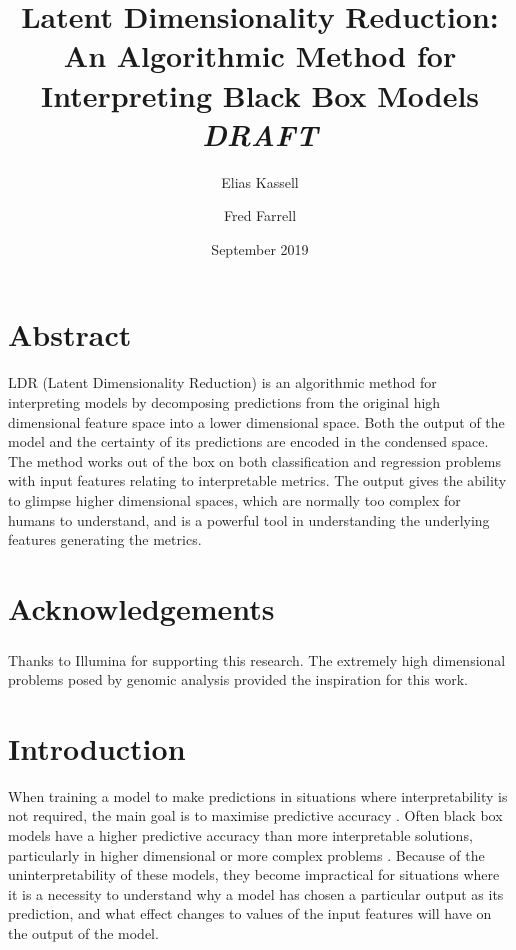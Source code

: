 \documentclass[a4paper, oneside, twocolumn]{article}
\begin{document}
\title{\huge Latent Dimensionality Reduction: An Algorithmic Method for Interpreting Black Box Models \\
\Large \emph{DRAFT}}
\author[1]{Elias Kassell}
\author[2]{Fred Farrell}

\date{September 2019}
\maketitle

\section{Abstract}\label{abstract}

LDR (Latent Dimensionality Reduction) is an algorithmic method for interpreting models by decomposing predictions from the original high dimensional feature space into a lower dimensional space. Both the output of the model and the certainty of its predictions are encoded in the condensed space. The method works out of the box on both classification and regression problems with input features relating to interpretable metrics. The output gives the ability to glimpse higher dimensional spaces, which are normally too complex for humans to understand, and is a powerful tool in understanding the underlying features generating the metrics.

\section*{Acknowledgements}

Thanks to Illumina\textsuperscript{\textregistered} for supporting this research. The extremely high dimensional problems posed by genomic analysis provided the inspiration for this work.

\section{Introduction}\label{Introduction}

When training a model to make predictions in situations where interpretability is not required, the main goal is to maximise predictive accuracy \cite{breiman2001statistical}. Often black box models have a higher predictive accuracy than more interpretable solutions, particularly in higher dimensional or more complex problems \cite{schmidhuber2015deep}. Because of the uninterpretability of these models, they become impractical for situations where it is a necessity to understand why a model has chosen a particular output as its prediction, and what effect changes to values of the input features will have on the output of the model.
\end{document}
